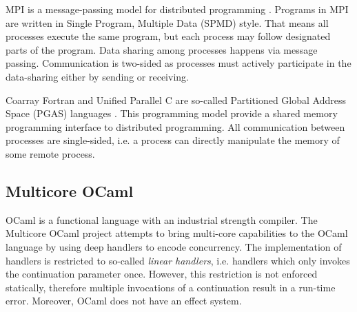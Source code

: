 \documentclass[preprint,10pt,numbers]{sigplanconf}
\begin{document}
MPI is a message-passing model for distributed programming \cite{Mpi2012}. Programs in MPI are written in Single Program, Multiple Data (SPMD) style. That means all processes execute the same program, but each process may follow designated parts of the program. Data sharing among processes happens via message passing. Communication is two-sided as processes must actively participate in the data-sharing either by sending or receiving.

Coarray Fortran and Unified Parallel C are so-called Partitioned Global Address Space (PGAS) languages \cite{Reid2005,Upc2013}. This programming model provide a shared memory programming interface to distributed programming. All communication between processes are single-sided, i.e. a process can directly manipulate the memory of some remote process.

\subsection{Multicore OCaml}
OCaml is a functional language with an industrial strength compiler. The Multicore OCaml project \cite{Dolan2015} attempts to bring multi-core capabilities to the OCaml language by using deep handlers to encode concurrency. The implementation of handlers is restricted to so-called \emph{linear handlers}, i.e. handlers which only invokes the continuation parameter once. However, this restriction is not enforced statically, therefore multiple invocations of a continuation result in a run-time error. Moreover, OCaml does not have an effect system.


\end{document}
